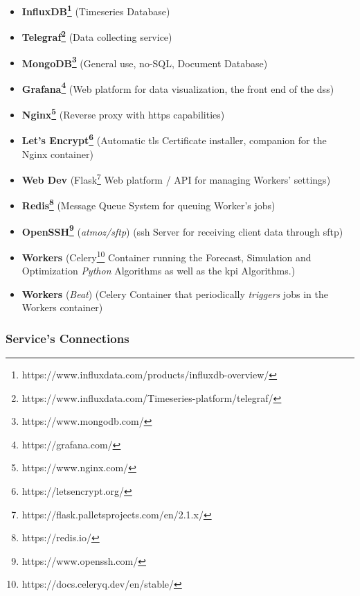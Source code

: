 \begin{itemize} 

\item \textbf{InfluxDB\footnote{https://www.influxdata.com/products/influxdb-overview/}\label{foot:influxdb}} (Timeseries Database)
\item \textbf{Telegraf\footnote{https://www.influxdata.com/Timeseries-platform/telegraf/}\label{foot:telegraf}} (Data collecting service)
\item \textbf{MongoDB\footnote{https://www.mongodb.com/}\label{foot:mongodb}} (General use, no-SQL, Document Database)
\item \textbf{Grafana\footnote{https://grafana.com/}\label{foot:grafana}} (Web platform for data visualization, the front end of the \gls{dss})
\item \textbf{Nginx\footnote{https://www.nginx.com/}\label{foot:nginx}} (Reverse proxy with \gls{https} capabilities)
\item \textbf{Let's Encrypt\footnote{https://letsencrypt.org/}\label{foot:letsencrypt}} (Automatic \gls{tls} Certificate installer, companion for the Nginx container)
\item \textbf{Web Dev} (Flask\footnote{https://flask.palletsprojects.com/en/2.1.x/}\label{foot:flask} Web platform / API for managing Workers' settings)
\item \textbf{Redis\footnote{https://redis.io/}\label{foot:redis}} (Message Queue System for queuing Worker's jobs)
\item \textbf{OpenSSH\footnote{https://www.openssh.com/}\label{foot:openssh}} (\textit{atmoz/sftp}) (\gls{ssh} Server for receiving client data through \gls{sftp})
\item \textbf{Workers} (Celery\footnote{https://docs.celeryq.dev/en/stable/}\label{foot:celery} Container running the Forecast, Simulation and Optimization \textit{Python} Algorithms as well as the \gls{kpi} Algorithms.)
\item \textbf{Workers} (\textit{Beat}) (Celery Container that periodically \textit{triggers} jobs in the Workers container)

\end{itemize}


\subsubsection{Service's Connections}


